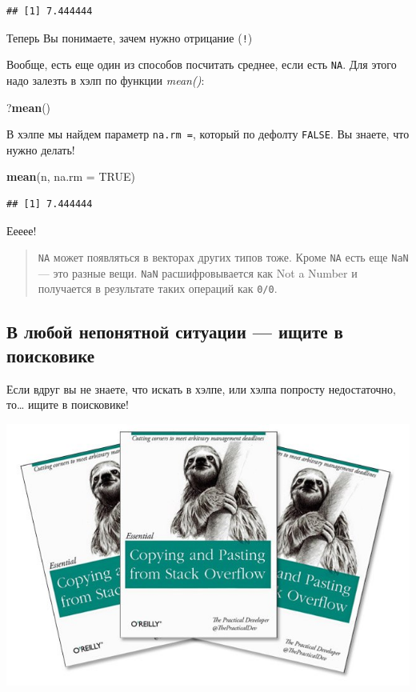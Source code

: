 \documentclass[]{book}
\newenvironment{Shaded}{\begin{snugshade}}{\end{snugshade}}
\newcommand{\DataTypeTok}[1]{\textcolor[rgb]{0.13,0.29,0.53}{#1}}
\newcommand{\KeywordTok}[1]{\textcolor[rgb]{0.13,0.29,0.53}{\textbf{#1}}}
\newcommand{\NormalTok}[1]{#1}
\newcommand{\OtherTok}[1]{\textcolor[rgb]{0.56,0.35,0.01}{#1}}
\begin{document}
\begin{verbatim}
## [1] 7.444444
\end{verbatim}

Теперь Вы понимаете, зачем нужно отрицание (\texttt{!})

Вообще, есть еще один из способов посчитать среднее, если есть \texttt{NA}. Для этого надо залезть в хэлп по функции \emph{mean()}:

\begin{Shaded}
\begin{Highlighting}[]
\NormalTok{?}\KeywordTok{mean}\NormalTok{()}
\end{Highlighting}
\end{Shaded}

В хэлпе мы найдем параметр \texttt{na.rm\ =}, который по дефолту \texttt{FALSE}. Вы знаете, что нужно делать!

\begin{Shaded}
\begin{Highlighting}[]
\KeywordTok{mean}\NormalTok{(n, }\DataTypeTok{na.rm =} \OtherTok{TRUE}\NormalTok{)}
\end{Highlighting}
\end{Shaded}

\begin{verbatim}
## [1] 7.444444
\end{verbatim}

Еееее!

\begin{quote}
\texttt{NA} может появляться в векторах других типов тоже. Кроме \texttt{NA} есть еще \texttt{NaN} --- это разные вещи. \texttt{NaN} расшифровывается как Not a Number и получается в результате таких операций как \texttt{0/0}.
\end{quote}

\hypertarget{google}{%
\subsection{В любой непонятной ситуации --- ищите в поисковике}\label{google}}

Если вдруг вы не знаете, что искать в хэлпе, или хэлпа попросту недостаточно, то\ldots{} ищите в поисковике!

\includegraphics{images/2AmXWgVoULk.jpg}
\end{document}
